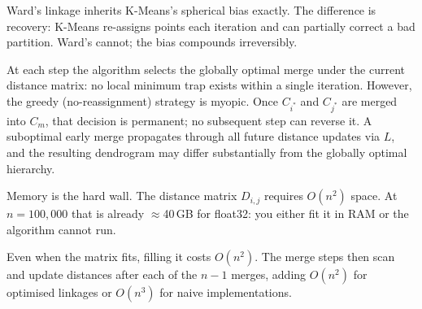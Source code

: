  Ward's linkage inherits K-Means's spherical 
bias exactly. The difference is recovery: K-Means re-assigns points each iteration and 
can partially correct a bad partition. Ward's cannot; the bias compounds irreversibly.


 At each step the algorithm
selects the globally optimal merge under the current distance matrix: no local minimum
trap exists within a single iteration. However, the greedy (no-reassignment) strategy is myopic. 
Once $C_{i^*}$ and $C_{j^*}$ are merged into $C_m$, that decision is permanent; 
no subsequent step can reverse it. A suboptimal early merge propagates through all 
future distance updates via $L$, and the resulting dendrogram may differ substantially 
from the globally optimal hierarchy.


\vspace{2.5em}
 Memory is the hard wall. The distance matrix $D_{i,j}$ requires $O(n^2)$ space.
At $n{=}100{,}000$ that is already $\approx$40\,GB for float32: you either fit it in RAM or the algorithm cannot run.

\vspace{1.0em}
 Even when the matrix fits, filling it costs $O(n^2)$.
The merge steps then scan and update distances after each of the $n{-}1$ merges, adding $O(n^2)$ for optimised linkages or $O(n^3)$ for naive implementations.


